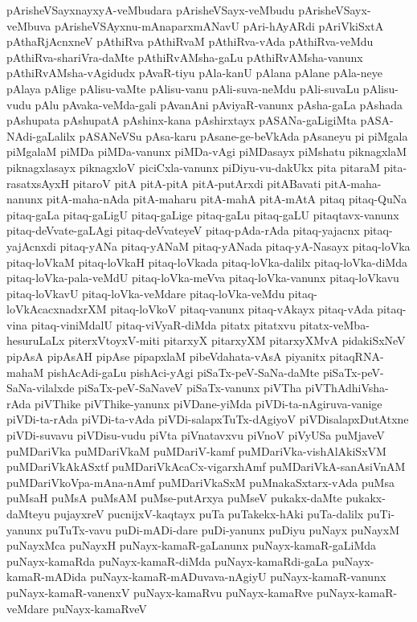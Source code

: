 {pArisheVSayxnayxyA-veMbudara
pArisheVSayx-veMbudu
pArisheVSayx-veMbuva
pArisheVSAyxnu-mAnaparxmANavU
pAri-hAyARdi
pAriVkiSxtA
pAthaRjAcnxneV
pAthiRva
pAthiRvaM
pAthiRva-vAda
pAthiRva-veMdu
pAthiRva-shariVra-daMte
pAthiRvAMsha-gaLu
pAthiRvAMsha-vanunx
pAthiRvAMsha-vAgidudx
pAvaR-tiyu
pAla-kanU
pAlana
pAlane
pAla-neye
pAlaya
pAlige
pAlisu-vaMte
pAlisu-vanu
pAli-suva-neMdu
pAli-suvaLu
pAlisu-vudu
pAlu
pAvaka-veMda-gali
pAvanAni
pAviyaR-vanunx
pAsha-gaLa
pAshada
pAshupata
pAshupatA
pAshinx-kana
pAshirxtayx
pASANa-gaLigiMta
pASA-NAdi-gaLalilx
pASANeVSu
pAsa-karu
pAsane-ge-beVkAda
pAsaneyu
pi
piMgala
piMgalaM
piMDa
piMDa-vanunx
piMDa-vAgi
piMDasayx
piMshatu
piknagxlaM
piknagxlasayx
piknagxloV
piciCxla-vanunx
piDiyu-vu-dakUkx
pita
pitaraM
pita-rasatxsAyxH
pitaroV
pitA
pitA-pitA
pitA-putArxdi
pitABavati
pitA-maha-nanunx
pitA-maha-nAda
pitA-maharu
pitA-mahA
pitA-mAtA
pitaq
pitaq-QuNa
pitaq-gaLa
pitaq-gaLigU
pitaq-gaLige
pitaq-gaLu
pitaq-gaLU
pitaqtavx-vanunx
pitaq-deVvate-gaLAgi
pitaq-deVvateyeV
pitaq-pAda-rAda
pitaq-yajacnx
pitaq-yajAcnxdi
pitaq-yANa
pitaq-yANaM
pitaq-yANada
pitaq-yA-Nasayx
pitaq-loVka
pitaq-loVkaM
pitaq-loVkaH
pitaq-loVkada
pitaq-loVka-dalilx
pitaq-loVka-diMda
pitaq-loVka-pala-veMdU
pitaq-loVka-meVva
pitaq-loVka-vanunx
pitaq-loVkavu
pitaq-loVkavU
pitaq-loVka-veMdare
pitaq-loVka-veMdu
pitaq-loVkAcacxnadxrXM
pitaq-loVkoV
pitaq-vanunx
pitaq-vAkayx
pitaq-vAda
pitaq-vina
pitaq-viniMdalU
pitaq-viVyaR-diMda
pitatx
pitatxvu
pitatx-veMba-hesuruLaLx
piterxVtoyxV-miti
pitarxyX
pitarxyXM
pitarxyXMvA
pidakiSxNeV
pipAsA
pipAsAH
pipAse
pipapxlaM
pibeVdahata-vAsA
piyanitx
pitaqRNA-mahaM
pishAcAdi-gaLu
pishAci-yAgi
piSaTx-peV-SaNa-daMte
piSaTx-peV-SaNa-vilalxde
piSaTx-peV-SaNaveV
piSaTx-vanunx
piVTha
piVThAdhiVsha-rAda
piVThike
piVThike-yanunx
piVDane-yiMda
piVDi-ta-nAgiruva-vanige
piVDi-ta-rAda
piVDi-ta-vAda
piVDi-salapxTuTx-dAgiyoV
piVDisalapxDutAtxne
piVDi-suvavu
piVDisu-vudu
piVta
piVnatavxvu
piVnoV
piVyUSa
puMjaveV
puMDariVka
puMDariVkaM
puMDariV-kamf
puMDariVka-vishAlAkiSxVM
puMDariVkAkASxtf
puMDariVkAcaCx-vigarxhAmf
puMDariVkA-sanAsiVnAM
puMDariVkoVpa-mAna-nAmf
puMDariVkaSxM
puMnakaSxtarx-vAda
puMsa
puMsaH
puMsA
puMsAM
puMse-putArxya
puMseV
pukakx-daMte
pukakx-daMteyu
pujayxreV
pucnijxV-kaqtayx
puTa
puTakekx-hAki
puTa-dalilx
puTi-yanunx
puTuTx-vavu
puDi-mADi-dare
puDi-yanunx
puDiyu
puNayx
puNayxM
puNayxMca
puNayxH
puNayx-kamaR-gaLanunx
puNayx-kamaR-gaLiMda
puNayx-kamaRda
puNayx-kamaR-diMda
puNayx-kamaRdi-gaLa
puNayx-kamaR-mADida
puNayx-kamaR-mADuvava-nAgiyU
puNayx-kamaR-vanunx
puNayx-kamaR-vanenxV
puNayx-kamaRvu
puNayx-kamaRve
puNayx-kamaR-veMdare
puNayx-kamaRveV
}

